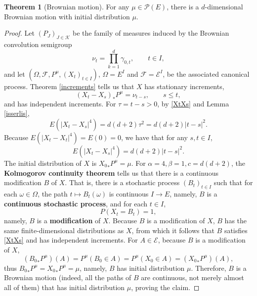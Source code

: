 \documentclass{article}
\theoremstyle{definition}
\newtheorem{theorem}{Theorem}
\theoremstyle{definition}
\begin{document}
\begin{theorem}[Brownian motion]
For any $\mu \in \mathscr{P}(E)$, there is a $d$-dimensional Brownian motion with initial distribution $\mu$.
\label{brownian}
\end{theorem}
\begin{proof}
Let $(P_J)_{J \in \mathscr{K}}$ be the family of measures induced by the Brownian convolution semigroup
\[
\nu_t = \prod_{k=1}^d \gamma_{0,t}, \qquad t \in I,
\]
and let $(\Omega,\mathscr{F},P^\mu,(X_t)_{t \in I})$, $\Omega=E^I$ and $\mathscr{F}=\mathscr{E}^I$,
be the associated canonical process.
Theorem \ref{increments} tells us that $X$ has stationary increments,
\begin{equation}
(X_t-X_s)_*P^\mu = \nu_{t-s},\qquad s \leq t,
\label{XtXs}
\end{equation}
and has independent increments. 
For $\tau=t-s>0$, by \eqref{XtXs} and 
Lemma \ref{isserlis},
\[
E(|X_t-X_s|^4) = d(d+2) \tau^2 = d(d+2) |t-s|^2.
\]
Because $E(|X_t-X_t|^4)=E(0)=0$, we have that for any $s,t \in I$,
\[
E(|X_t-X_s|^4)  = d(d+2)|t-s|^2.
\]
The initial distribution of $X$ is ${X_0}_*P^\mu = \mu$.
For $\alpha=4, \beta=1, c=d(d+2)$, the \textbf{Kolmogorov continuity theorem} tells us that there is a continuous modification $B$ of $X$. That is, there is a stochastic process $(B_t)_{t \in I}$
such that for each $\omega \in \Omega$, the path $t \mapsto B_t(\omega)$ is continuous 
$I \to E$, namely, $B$ is a \textbf{continuous stochastic process}, and
for each $t \in I$, 
\[
P(X_t = B_t)=1,
\]
namely, $B$ is a \textbf{modification} of $X$. Because $B$ is a modification of $X$, $B$ has the same finite-dimensional distributions as $X$, from which it follows that $B$ satisfies \eqref{XtXs} and has independent increments. 
For $A \in \mathscr{E}$, because $B$ is a modification of $X$,
\[
({B_0}_*P^\mu)(A) = P^\mu(B_0 \in A) = P^\mu(X_0 \in A) = ({X_0}_*P^\mu)(A),
\]
thus ${B_0}_*P^\mu = {X_0}_*P^\mu = \mu$, namely, $B$ has initial distribution $\mu$.
Therefore, $B$ is a Brownian motion (indeed, all the paths of $B$ are continuous, not merely almost all of them) that has initial distribution
$\mu$, proving the claim.
\end{proof}
\end{document}
